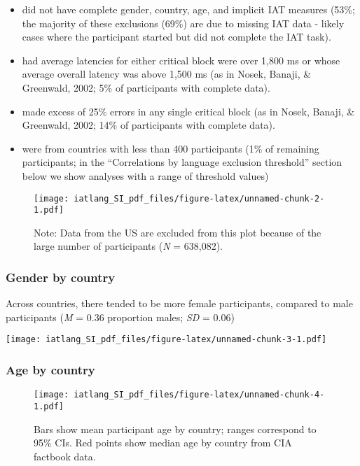 \documentclass[]{article}
\providecommand{\tightlist}{%
  \setlength{\itemsep}{0pt}\setlength{\parskip}{0pt}}
\begin{document}
\begin{itemize}
\tightlist
\item
  did not have complete gender, country, age, and implicit IAT measures
  (53\%; the majority of these exclusions (69\%) are due to missing IAT
  data - likely cases where the participant started but did not complete
  the IAT task).
\item
  had average latencies for either critical block were over 1,800 ms or
  whose average overall latency was above 1,500 ms (as in Nosek, Banaji,
  \& Greenwald, 2002; 5\% of participants with complete data).
\item
  made excess of 25\% errors in any single critical block (as in Nosek,
  Banaji, \& Greenwald, 2002; 14\% of participants with complete data).
\item
  were from countries with less than 400 participants (1\% of remaining
  participants; in the ``Correlations by language exclusion threshold''
  section below we show analyses with a range of threshold values)
\end{itemize}

\begin{figure}
\centering
\texttt{[image: iatlang\_SI\_pdf\_files/figure-latex/unnamed-chunk-2-1.pdf]}
\caption{Note: Data from the US are excluded from this plot because of
the large number of participants (\emph{N} = 638,082).}
\end{figure}

\hypertarget{gender-by-country}{%
\subsubsection{Gender by country}\label{gender-by-country}}

Across countries, there tended to be more female participants, compared
to male participants (\emph{M} = 0.36 proportion males; \emph{SD} =
0.06)

\texttt{[image: iatlang\_SI\_pdf\_files/figure-latex/unnamed-chunk-3-1.pdf]}

\hypertarget{age-by-country}{%
\subsubsection{Age by country}\label{age-by-country}}

\begin{figure}
\centering
\texttt{[image: iatlang\_SI\_pdf\_files/figure-latex/unnamed-chunk-4-1.pdf]}
\caption{Bars show mean participant age by country; ranges correspond to
95\% CIs. Red points show median age by country from CIA factbook data.}
\end{figure}
\end{document}
